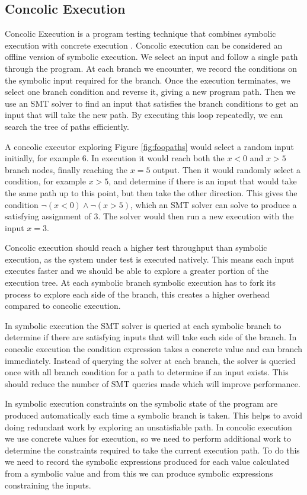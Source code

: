 \documentclass[12pt,twoside]{report}
\begin{document}
\subsection{Concolic Execution}
Concolic Execution is a program testing technique that combines symbolic execution with concrete execution \cite{217563}.
Concolic execution can be considered an offline version of symbolic execution. We select an input and follow a single path through the program. At each branch we encounter, we record the conditions on the symbolic input required for the branch. Once the execution terminates, we select one branch condition and reverse it, giving a new program path. Then we use an SMT solver to find an input that satisfies the branch conditions to get an input that will take the new path. By executing this loop repeatedly, we can search the tree of paths efficiently.

A concolic executor exploring Figure \ref{fig:foopaths} would select a random input initially, for example 6. In execution it would reach both the $x < 0$ and $x > 5$ branch nodes, finally reaching the $x = 5$ output. Then it would randomly select a condition, for example $x > 5$, and determine if there is an input that would take the same path up to this point, but then take the other direction. This gives the condition $\neg(x < 0) \wedge \neg(x > 5)$, which an SMT solver can solve to produce a satisfying assignment of $3$. The solver would then run a new execution with the input $x = 3$.

Concolic execution should reach a higher test throughput than symbolic execution, as the system under test is executed natively. This means each input executes faster and we should be able to explore a greater portion of the execution tree. At each symbolic branch symbolic execution has to fork its process to explore each side of the branch, this creates a higher overhead compared to concolic execution.

In symbolic execution the SMT solver is queried at each symbolic branch to determine if there are satisfying inputs that will take each side of the branch. In concolic execution the condition expression takes a concrete value and can branch immediately. Instead of querying the solver at each branch, the solver is queried once with all branch condition for a path to determine if an input exists. This should reduce the number of SMT queries made which will improve performance.

In symbolic execution constraints on the symbolic state of the program are produced automatically each time a symbolic branch is taken. This helps to avoid doing redundant work by exploring an unsatisfiable path. In concolic execution we use concrete values for execution, so we need to perform additional work to determine the constraints required to take the current execution path. To do this we need to record the symbolic expressions produced for each value calculated from a symbolic value and from this we can produce symbolic expressions constraining the inputs.
\end{document}
